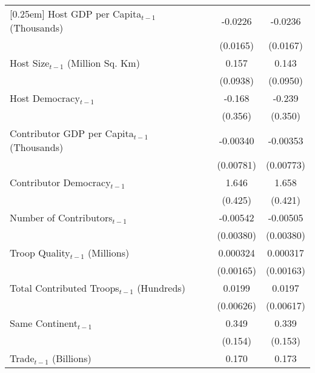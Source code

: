 \begin{table}[htbp]
\begin{tabular}{l*{3}{c}}
[0.25em]
Host GDP per Capita$_{t-1}$ (Thousands)&                    &     -0.0226        &     -0.0236        \\
                    &                    &    (0.0165)        &    (0.0167)        \\
[0.25em]
Host Size$_{t-1}$ (Million Sq. Km)&                    &       0.157\sym{\dagger} &       0.143        \\
                    &                    &    (0.0938)        &    (0.0950)        \\
[0.25em]
Host Democracy$_{t-1}$      &                    &      -0.168        &      -0.239        \\
                    &                    &     (0.356)        &     (0.350)        \\
[0.25em]
Contributor GDP per Capita$_{t-1}$ (Thousands)&                    &    -0.00340        &    -0.00353        \\
                    &                    &   (0.00781)        &   (0.00773)        \\
[0.25em]
Contributor Democracy$_{t-1}$&                    &       1.646\sym{**}&       1.658\sym{**}\\
                    &                    &     (0.425)        &     (0.421)        \\
[0.25em]
Number of Contributors$_{t-1}$&                    &    -0.00542        &    -0.00505        \\
                    &                    &   (0.00380)        &   (0.00380)        \\
[0.25em]
Troop Quality$_{t-1}$ (Millions)&                    &    0.000324        &    0.000317        \\
                    &                    &   (0.00165)        &   (0.00163)        \\
[0.25em]
Total Contributed Troops$_{t-1}$ (Hundreds)&                    &      0.0199\sym{**}&      0.0197\sym{**}\\
                    &                    &   (0.00626)        &   (0.00617)        \\
[0.25em]
Same Continent$_{t-1}$      &                    &       0.349\sym{*} &       0.339\sym{*} \\
                    &                    &     (0.154)        &     (0.153)        \\
[0.25em]
Trade$_{t-1}$ (Billions)    &                    &       0.170\sym{*} &       0.173\sym{*} \\

\end{tabular}
\end{table}
